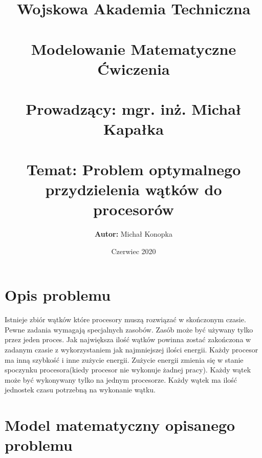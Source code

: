 \documentclass[a4paper,12pt]{extarticle}
\title{%
  Wojskowa Akademia Techniczna \\~\\
  \large Modelowanie Matematyczne Ćwiczenia \\~\\
    \textbf{Prowadzący:} mgr. inż. Michał Kapałka \\~\\
    \textbf{Temat:} Problem optymalnego przydzielenia wątków do procesorów}
\author{\textbf{Autor:} Michał Konopka}
\date{Czerwiec 2020}
\begin{document}
\maketitle
\newpage

\section{Opis problemu}
Istnieje zbiór wątków które procesory muszą rozwiązać w skończonym czasie. Pewne zadania wymagają specjalnych zasobów. Zasób może być używany tylko przez jeden proces. Jak największa ilość wątków powinna zostać zakończona w zadanym czasie z wykorzystaniem jak najmniejszej ilości energii. Każdy procesor ma inną szybkość i inne zużycie energii. Zużycie energii  zmienia się w stanie spoczynku procesora(kiedy procesor nie wykonuje żadnej pracy). Każdy wątek może być wykonywany tylko na jednym procesorze. Każdy wątek ma ilość jednostek czasu potrzebną na wykonanie wątku.\\

\section{Model matematyczny opisanego problemu}
\end{document}
